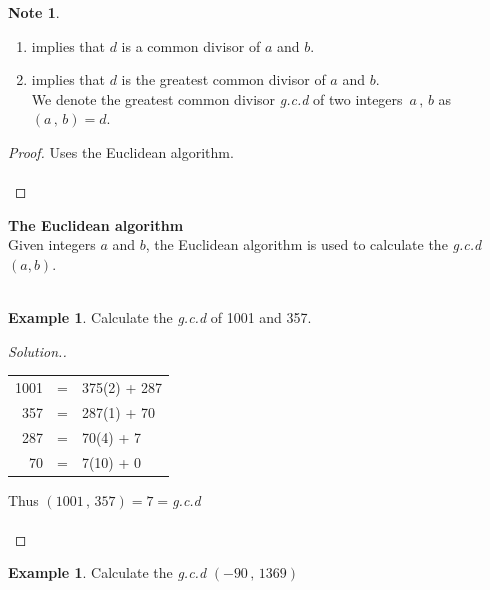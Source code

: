 \documentclass[11pt,a4paper]{article}
\theoremstyle{definition}
\newtheorem{exa}[thm]{Example}
\newtheorem*{note}{Note}
\newenvironment{solution}
  {\renewcommand{\qedsymbol}{}\begin{proof}[\textit{Solution}.]}
  {\end{proof}}
\begin{document}
\begin{note}
\begin{enumerate}
\item[(a)] implies that $d$ is a common divisor of $a$ and $b$.
\item[(b)] implies that $d$ is the greatest common divisor of $a$ and $b$.\\

We denote the greatest common divisor \textit{g.c.d} of two integers $\, a\, ,\, b$ as $(a\, , \, b) = d$.\\
\end{enumerate}

\begin{proof}
Uses the Euclidean algorithm.\\\\
\end{proof}
\end{note}







\textbf{The Euclidean algorithm}\\
Given integers $a$ and $b$, the Euclidean algorithm is used to calculate the \textit{g.c.d} $(a,b)$.\\\\




\begin{exa}
Calculate the \textit{g.c.d} of 1001 and 357.\\
\end{exa}


\begin{solution}
\begin{table}[H]
\begin{tabular}{rcl}
1001 & = & 375(2) + 287\\
357  & = & 287(1) + 70\\
287  & = & 70(4) + 7\\
70   & = & 7(10) + 0\\
\end{tabular}
\hspace{1.5cm} Thus $(1001\, , \, 357) = 7 = $\textit{g.c.d}\\\\
\end{table}
\end{solution}





\begin{exa}
Calculate the \textit{g.c.d}  $(-90\, , \, 1369)$\\
\end{exa}
\end{document}
